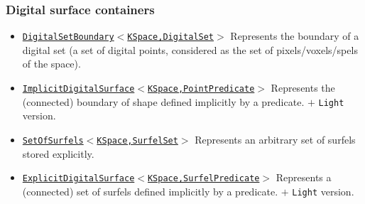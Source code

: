 \documentclass[pdftex,francais]{beamer}
\begin{document}
\begin{frame}%
  \frametitle{Digital surface containers}

\begin{itemize}[<+->]
\item \href{http://liris.cnrs.fr/dgtal/doc/nightly/classDGtal_1_1DigitalSetBoundary.html}{\texttt{\alert{DigitalSetBoundary}$<$KSpace,DigitalSet$>$}}
  Represents the boundary of a digital set (a set of
  digital points, considered as the set of pixels/voxels/spels of
  the space).


\item \href{http://liris.cnrs.fr/dgtal/doc/nightly/classDGtal_1_1ImplicitDigitalSurface.html}{\texttt{\alert{ImplicitDigitalSurface}$<$KSpace,PointPredicate$>$}} Represents the (connected) boundary
  of shape defined implicitly by a predicate. $+$ \alert{\tt Light} version.

  
\item \href{http://liris.cnrs.fr/dgtal/doc/nightly/classDGtal_1_1SetOfSurfels.html}{\texttt{\alert{SetOfSurfels}$<$KSpace,SurfelSet$>$}} Represents an arbitrary set of surfels stored
  explicitly.


\item \href{http://liris.cnrs.fr/dgtal/doc/nightly/classDGtal_1_1ExplicitDigitalSurface.html}{\texttt{\alert{ExplicitDigitalSurface}$<$KSpace,SurfelPredicate$>$}} Represents a (connected) set of
  surfels defined implicitly by a predicate.  $+$ \alert{\tt Light} version.


\end{itemize}
\end{frame}
\end{document}

